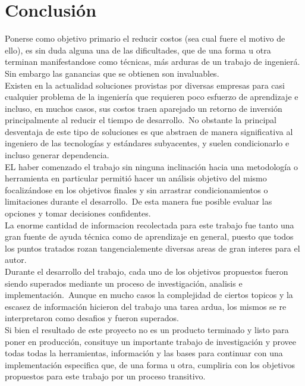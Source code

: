 \chapter{Conclusi\'on}

Ponerse como objetivo primario el reducir costos (sea cual fuere el motivo de
ello), es sin duda alguna una de las dificultades, que de una forma u otra
terminan manifestandose como t\'ecnicas, m\'as arduras de un trabajo de
ingenier\'a. Sin embargo las ganancias que se obtienen son invaluables.\\

Existen en la actualidad soluciones provistas por diversas empresas para casi
cualquier problema de la ingenier\'ia que requieren poco esfuerzo de
aprendizaje e incluso, en muchos casos, sus costos traen aparejado un retorno
de inversi\'on principalmente al reducir el tiempo de desarrollo.\
No obstante la principal desventaja de este tipo de soluciones es que abstraen
de manera significativa al ingeniero de las tecnolog\'ias y est\'andares
subyacentes, y suelen condicionarlo e incluso generar dependencia.\\

EL haber comenzado el trabajo sin ninguna inclinaci\'on hacia una metodolog\'ia
o herramienta en particular permiti\'o hacer un an\'alisis objetivo del mismo
focaliz\'andose en los objetivos finales y sin arrastrar condicionamientos
o limitaciones durante el desarrollo.\ 
De esta manera fue posible evaluar las opciones y tomar decisiones
confidentes.\\

La enorme cantidad de informacion recolectada para este trabajo fue tanto una
gran fuente de ayuda t\'ecnica como de aprendizaje en general, puesto que
todos los puntos tratados rozan tangencialemente diversas areas de gran
interes para el autor.\\

Durante el desarrollo del trabajo, cada uno de los objetivos propuestos fueron
siendo superados mediante un proceso de investigaci\'on, analisis e
implementaci\'on.\
Aunque en mucho casos la complejidad de ciertos topicos y la escasez de
informaci\'on hicieron del trabajo una tarea ardua, los mismos se re
interpretaron como desafios y fueron superados.\\

Si bien el resultado de este proyecto no es un producto terminado y listo para
poner en producci\'on, consituye un importante trabajo de investigaci\'on y
provee todas todas la herramientas, informaci\'on y las bases para continuar
con una implementaci\'on especifica que, de una forma u otra, cumpliria con los
objetivos propuestos para este trabajo por un proceso transitivo.


